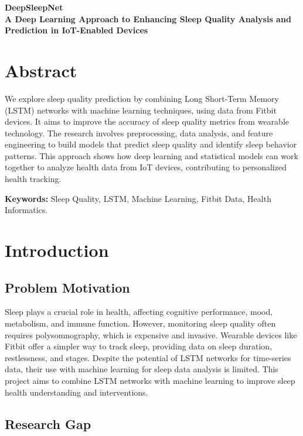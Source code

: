 \documentclass[10pt]{extarticle}
\begin{document}

\begin{center}
    {\LARGE \textbf{DeepSleepNet}} \\
    {\large \textbf{A Deep Learning Approach to Enhancing Sleep Quality Analysis and Prediction in IoT-Enabled Devices}}
\end{center}

\section{Abstract}

We explore sleep quality prediction by combining Long Short-Term Memory (LSTM) networks with machine learning techniques, using data from Fitbit devices. It aims to improve the accuracy of sleep quality metrics from wearable technology. The research involves preprocessing, data analysis, and feature engineering to build models that predict sleep quality and identify sleep behavior patterns. This approach shows how deep learning and statistical models can work together to analyze health data from IoT devices, contributing to personalized health tracking.

\textbf{Keywords:} Sleep Quality, LSTM, Machine Learning, Fitbit Data, Health Informatics.

\section{Introduction}

\subsection{Problem Motivation}

Sleep plays a crucial role in health, affecting cognitive performance, mood, metabolism, and immune function. However, monitoring sleep quality often requires polysomnography, which is expensive and invasive. Wearable devices like Fitbit offer a simpler way to track sleep, providing data on sleep duration, restlessness, and stages. Despite the potential of LSTM networks for time-series data, their use with machine learning for sleep data analysis is limited. This project aims to combine LSTM networks with machine learning to improve sleep health understanding and interventions.

\subsection{Research Gap}
\end{document}
